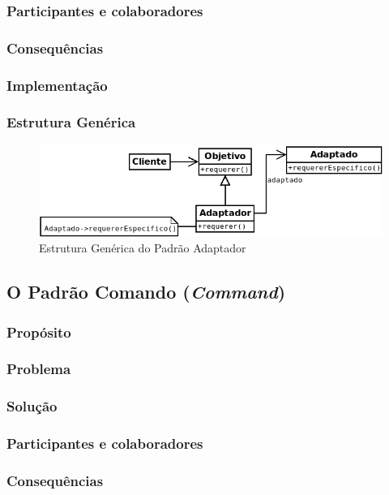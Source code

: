 \subsubsection{Participantes e colaboradores}
\subsubsection{Consequências}
\subsubsection{Implementação}
\subsubsection{Estrutura Genérica}

\begin{figure}[h]
\begin{center}
\includegraphics[scale=0.6]{adaptador.png}
\caption{Estrutura Genérica do Padrão Adaptador}\label{fig:adaptador}
\end{center}
\end{figure}

\subsection{O Padrão Comando (\textit{Command})}
\subsubsection{Propósito}
\subsubsection{Problema}
\subsubsection{Solução}
\subsubsection{Participantes e colaboradores}
\subsubsection{Consequências}
